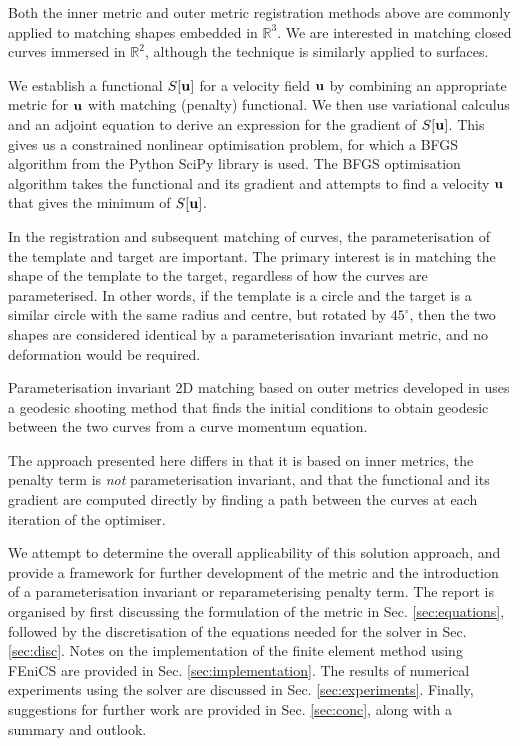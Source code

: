 \documentclass[a4paper, 12pt]{article}
\begin{document}
Both the inner metric and outer metric registration methods above are commonly applied to
matching shapes embedded in $\mathbb{R}^3$. We are interested in matching closed
curves immersed in $\mathbb{R}^2$, although the technique is similarly applied to
surfaces.

We establish a functional $S[\mathbf{u}]$ for a velocity field $\mathbf{u}$ by
combining an appropriate metric for $\mathbf{u}$ with matching (penalty)
functional. We then use variational calculus and an adjoint equation to derive
an expression for the gradient of $S[\mathbf{u}]$. This gives us a constrained
nonlinear optimisation problem, for which a BFGS algorithm from the Python
SciPy\cite{scipy} library is used. The BFGS optimisation algorithm takes the
functional and its gradient and attempts to find a velocity $\mathbf{u}$ that gives
the minimum of $S[\mathbf{u}]$.


In the registration and subsequent matching of curves, the parameterisation of
the template and target are important. The primary interest is in matching the
shape of the template to the target, regardless of how the curves are
parameterised. In other words, if the template is a circle and the target is a
similar circle with the same radius and centre, but rotated by $45^{\circ}$,
then the two shapes are considered identical by a parameterisation invariant
metric, and no deformation would be required.

Parameterisation invariant 2D matching based on outer metrics developed in
\cite{cotter2009geodesic, cotter2009curves, clark2011reparam} uses a geodesic
shooting method that finds the initial conditions to obtain geodesic between the
two curves from a curve momentum equation.

The approach presented here differs in that it is based on inner metrics, the
penalty term is \emph{not} parameterisation invariant, and that the
functional and its gradient are computed directly by finding
a path between the curves at each iteration of the optimiser.


We attempt to determine the overall applicability of this solution approach, and
provide a framework for further development of the metric and the introduction
of a parameterisation invariant or reparameterising penalty term. The report is
organised by first discussing the formulation of the metric in
Sec. \ref{sec:equations}, followed by the discretisation of the equations needed
for the solver in Sec. \ref{sec:disc}. Notes on the implementation of the finite
element method using FEniCS are provided in Sec. \ref{sec:implementation}. The
results of numerical experiments using the solver are discussed in
Sec. \ref{sec:experiments}. Finally, suggestions for further work
are provided in Sec. \ref{sec:conc}, along with a summary and outlook.
\end{document}
